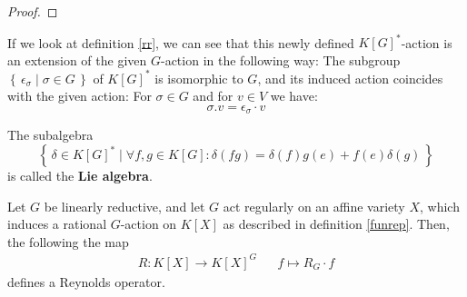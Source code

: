 \begin{proof}
  
\end{proof}

\begin{remark}
  If we look at definition \ref{rr}, we can see that this newly defined $K[G]^\ast$-action is an extension of the given $G$-action in the following way:
  The subgroup $\left\{\, \epsilon_\sigma \mid \sigma \in G \,\right\}$ of $K[G]^\ast$ is isomorphic to $G$, and its induced action coincides with the given action:
  For $\sigma \in G$ and for $v \in V$ we have:
  \begin{equation}
    \sigma . v = \epsilon_\sigma \cdot v
  \end{equation}
\end{remark}

\begin{remark}
  The subalgebra
  \begin{equation}
    \left\{\, \delta \in K[G]^\ast \mid \forall f,g \in K[G] : \delta (fg) = \delta (f) g(e) + f(e)\delta (g) \,\right\}
  \end{equation}
  is called the \textbf{Lie algebra}.
\end{remark}

\begin{theorem}\label{ro}
  Let $G$ be linearly reductive, and let $G$ act regularly on an affine variety $X$, which induces a rational $G$-action on $K[X]$ as described in definition \ref{funrep}.
  Then, the following the map
  \begin{align}
    R \colon K[X] \longrightarrow K[X]^G && f \mapsto R_G \cdot f
  \end{align}
  defines a Reynolds operator.
\end{theorem}

